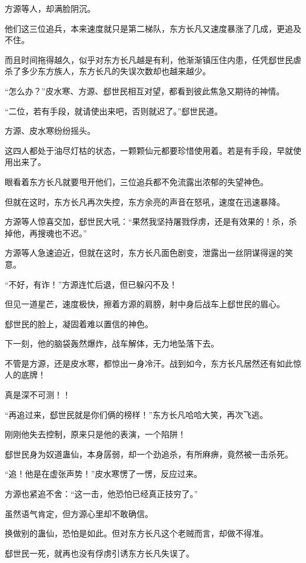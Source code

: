 \begin{this_body}
方源等人，却满脸阴沉。

他们这三位追兵，本来速度就只是第二梯队，东方长凡又速度暴涨了几成，更追及不住。

而且时间拖得越久，似乎对东方长凡越是有利，他渐渐镇压住内患，任凭郄世民虐杀了多少东方族人，东方长凡的失误次数却也越来越少。

“怎么办？”皮水寒、方源、郄世民相互对望，都看到彼此焦急又期待的神情。

“二位，若有手段，就请使出来吧，否则就迟了。”郄世民道。

方源、皮水寒纷纷摇头。

这四人都处于油尽灯枯的状态，一颗颗仙元都要珍惜使用着。若是有手段，早就使用出来了。

眼看着东方长凡就要甩开他们，三位追兵都不免流露出浓郁的失望神色。

但就在这时，东方长凡再次失控，东方余亮的声音在怒吼，速度在迅速暴降。

方源等人惊喜交加，郄世民大吼：“果然我坚持屠戮俘虏，还是有效果的！杀，杀掉他，再搜魂也不迟。”

方源等人急速迫近，但就在这时，东方长凡面色剧变，泄露出一丝阴谋得逞的笑意。

“不好，有诈！”方源连忙后退，但已躲闪不及！

但见一道星芒，速度极快，擦着方源的肩膀，射中身后战车上郄世民的眉心。

郄世民的脸上，凝固着难以置信的神色。

下一刻，他的脑袋轰然爆炸，战车解体，无力地坠落下去。

不管是方源，还是皮水寒，都惊出一身冷汗。战到如今，东方长凡居然还有如此惊人的底牌！

真是深不可测！！

“再追过来，郄世民就是你们俩的榜样！”东方长凡哈哈大笑，再次飞逃。

刚刚他失去控制，原来只是他的表演，一个陷阱！

郄世民身为奴道蛊仙，本身孱弱，却一个劲追杀，有所麻痹，竟然被一击杀死。

“追！他是在虚张声势！”皮水寒愣了一愣，反应过来。

方源也紧追不舍：“这一击，他恐怕已经真正技穷了。”

虽然语气肯定，但方源心里却不敢确信。

换做别的蛊仙，恐怕是如此。但对东方长凡这个老贼而言，却做不得准。

郄世民一死，就再也没有俘虏引诱东方长凡失误了。


\end{this_body}

